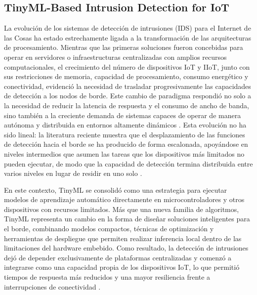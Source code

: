 \documentclass[journal,article,submit,moreauthors]{Definitions/mdpi}
\begin{document}
\subsection{TinyML-Based Intrusion Detection for IoT}
La evolución de los sistemas de detección de intrusiones (IDS) para el Internet de las Cosas ha estado estrechamente ligada a la transformación de las arquitecturas de procesamiento. Mientras que las primeras soluciones fueron concebidas para operar en servidores o infraestructuras centralizadas con amplios recursos computacionales, el crecimiento del número de dispositivos IoT y IIoT, junto con sus restricciones de memoria, capacidad de procesamiento, consumo energético y conectividad, evidenció la necesidad de trasladar progresivamente las capacidades de detección a los nodos de borde. Este cambio de paradigma respondió no solo a la necesidad de reducir la latencia de respuesta y el consumo de ancho de banda, sino también a la creciente demanda de sistemas capaces de operar de manera autónoma y distribuida en entornos altamente dinámicos \cite{Ni2024,Amanullah2020,Bagaa2020,SaravanaBalaji2023}. Esta evolución no ha sido lineal: la literatura reciente muestra que el desplazamiento de las funciones de detección hacia el borde se ha producido de forma escalonada, apoyándose en niveles intermedios que asumen las tareas que los dispositivos más limitados no pueden ejecutar, de modo que la capacidad de detección termina distribuida entre varios niveles en lugar de residir en uno solo \cite{Tamuka2026}.

En este contexto, TinyML se consolidó como una estrategia para ejecutar modelos de aprendizaje automático directamente en microcontroladores y otros dispositivos con recursos limitados. Más que una nueva familia de algoritmos, TinyML representa un cambio en la forma de diseñar soluciones inteligentes para el borde, combinando modelos compactos, técnicas de optimización y herramientas de despliegue que permiten realizar inferencia local dentro de las limitaciones del hardware embebido. Como resultado, la detección de intrusiones dejó de depender exclusivamente de plataformas centralizadas y comenzó a integrarse como una capacidad propia de los dispositivos IoT, lo que permitió tiempos de respuesta más reducidos y una mayor resiliencia frente a interrupciones de conectividad \cite{Tekin2023,Amuthadevi2025,Dini2024,Heydari2024}.
\end{document}
